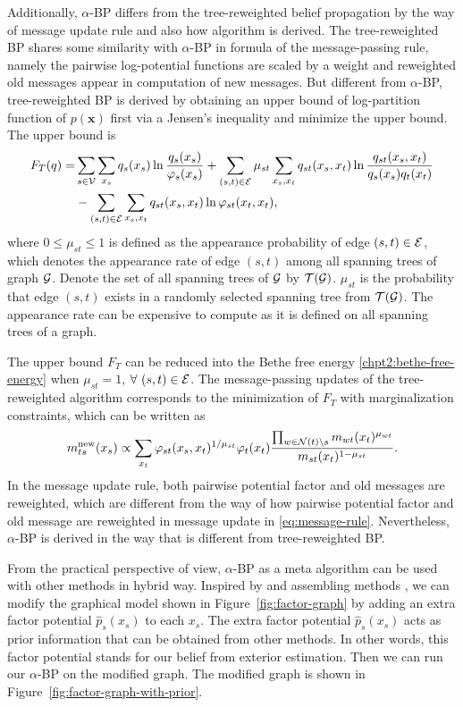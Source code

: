 Additionally, $\alpha$-BP differs from the tree-reweighted belief propagation \cite{wainwright2008graphical} by the way of message update rule and also how algorithm is derived. 
The tree-reweighted BP shares some similarity with $\alpha$-BP in formula of the message-passing rule, namely the pairwise log-potential functions are scaled by a weight and reweighted old messages appear in computation of new messages. But different from $\alpha$-BP, tree-reweighted BP is derived by obtaining an upper bound of log-partition function of $p(\bm{x})$ first via a Jensen's inequality and minimize the upper bound. The upper bound is
\begin{align}
   F_T(q) =& \sum_{s\in\mathcal{V}}\sum_{x_s}q_s(x_s) \ln{\frac{q_s(x_s)}{\varphi_s(x_s)}}  + \sum_{(s,t)\in\mathcal{E}}\mu_{st}\sum_{x_s, x_t} q_{st}(x_s, x_t) \ln\frac{q_{st}(x_s,x_t)}{q_s(x_s)q_t(x_t)} \nonumber \\
  & - \sum_{(s,t)\in\mathcal{E}}\sum_{x_s, x_t} q_{st}(x_s, x_t)\ln{\varphi_{st}(x_t, x_t)},
\end{align}
where $0\leq \mu_{st} \leq 1$ is defined as the appearance probability of edge $(s, t) \in \mathcal{E}$, which denotes the appearance rate of edge $(s,t)$ among all spanning trees of graph $\mathcal{G}$. Denote the set of all spanning trees of $\mathcal{G}$ by $\mathcal{T}(\mathcal{G})$. $\mu_{st}$ is the probability that edge $(s,t)$ exists in a randomly selected spanning tree from $\mathcal{T}(\mathcal{G})$. The appearance rate can be expensive to compute as it is defined on all spanning trees of a graph.


The upper bound $F_T$ can be reduced into the Bethe free energy \eqref{chpt2:bethe-free-energy} when $\mu_{st}=1$, $\forall ~(s,t)\in \mathcal{E}$. The message-passing updates of the tree-reweighted algorithm corresponds to the minimization of $F_T$ with marginalization constraints, which can be written as
\begin{align}
    {m}^{\text{new}}_{ts}(x_s) \propto \sum_{x_t} \varphi_{st}(x_s, x_t)^{1/\mu_{st}} {\varphi}_t(x_t) \frac{\prod_{w\in \mathcal{N}(t)\backslash s}m_{wt}(x_t)^{\mu_{wt}} }{m_{st}(x_t)^{1-\mu_{st}}}.
\end{align}
In the message update rule, both pairwise potential factor and old messages are reweighted, which are different from the way of how pairwise potential factor and old message are reweighted in message update in \eqref{eq:message-rule}. Nevertheless, $\alpha$-BP is derived in the way that is different from tree-reweighted BP.


From the practical perspective of view, $\alpha$-BP as a meta algorithm can be used with other methods in hybrid way. Inspired by \cite{pseudo_priorBP2010} and assembling methods \cite{James:2014:ISL:2517747}, we can modify the graphical model shown in Figure~\ref{fig:factor-graph} by adding an extra factor potential $\hat{p}_s(x_s)$ to each $x_s$. The extra factor potential $\hat{p}_s(x_s)$ acts as prior information that can be obtained from other methods. In other words, this factor potential stands for our belief from exterior estimation. Then we can run our $\alpha$-BP on the modified graph. The modified graph is shown in Figure~\ref{fig:factor-graph-with-prior}.

